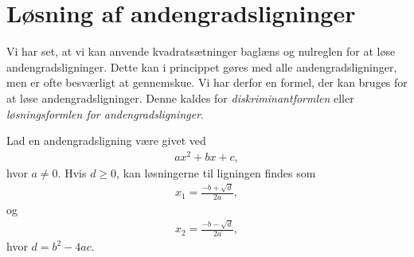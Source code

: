 \section*{Løsning af andengradsligninger}
Vi har set, at vi kan anvende kvadratsætninger baglæns og nulreglen for at løse andengradsligninger. Dette kan i princippet gøres med alle andengradsligninger, men er ofte besværligt at gennemskue. Vi har derfor en formel, der kan bruges for at løse andengradsligninger. Denne kaldes for \textit{diskriminantformlen} eller \textit{løsningsformlen for andengradsligninger}.
\begin{setn}[Diskriminantformlen]
	Lad en andengradsligning være givet ved
	\begin{align*}
		ax^2 + bx + c,
	\end{align*}
	hvor $a \neq 0$. Hvis $d \geq 0$, kan løsningerne til ligningen findes som
	\begin{align*}
		x_1 = \frac{-b+ \sqrt{d}}{2a},
	\end{align*}
	og
	\begin{align*}
		x_2 = \frac{-b - \sqrt{d}}{2a},
	\end{align*}
	hvor $d = b^2 - 4ac$. 
\end{setn}
